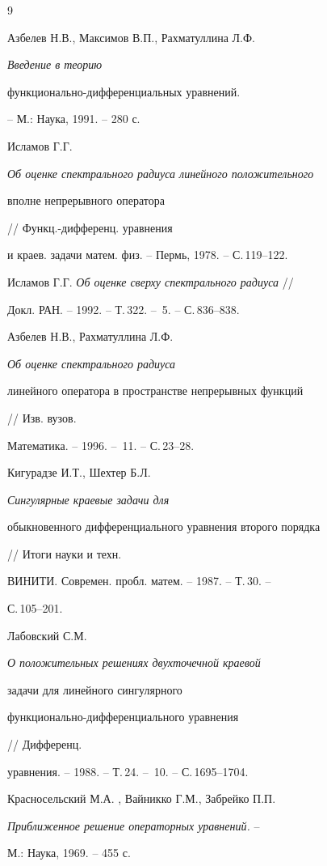 \begin{thebibliography}{9}







Азбелев Н.В., Максимов В.П., Рахматуллина Л.Ф. {\it Введение в теорию


функционально-дифференциальных уравнений.} -- М.: Наука, 1991. -- 280 с.




Исламов Г.Г. {\it Об оценке спектрального радиуса линейного положительного


вполне непрерывного оператора} // Функц.-дифференц. уравнения


и краев. задачи матем. физ. -- Пермь, 1978. -- С.\,119--122.




Исламов Г.Г. {\it Об оценке сверху спектрального радиуса} //


Докл. РАН. -- 1992. -- Т.\,322. -- \No\,5. -- С.\,836--838.




Азбелев Н.В., Рахматуллина Л.Ф. {\it Об оценке спектрального радиуса


линейного оператора в пространстве непрерывных функций} // Изв. вузов.


Математика. -- 1996. -- \No\,11. -- С.\,23--28.




Кигурадзе И.Т., Шехтер Б.Л. {\it Сингулярные краевые задачи для


обыкновенного дифференциального уравнения второго порядка}


// Итоги науки и техн.


ВИНИТИ. Современ. пробл. матем. -- 1987. -- Т.\,30. --


С.\,105--201.




Лабовский С.М. {\it О положительных решениях двухточечной краевой


задачи для линейного сингулярного


функционально-дифференциального уравнения} // Дифференц.


уравнения. -- 1988. -- Т.\,24. -- \No\,10. -- С.\,1695--1704.




Красносельский М.А. , Вайникко Г.М., Забрейко П.П.


{\it Приближенное решение операторных уравнений.} --


М.: Наука, 1969. -- 455 с.





\end{thebibliography}





\vskip 2cm












\label{end}





